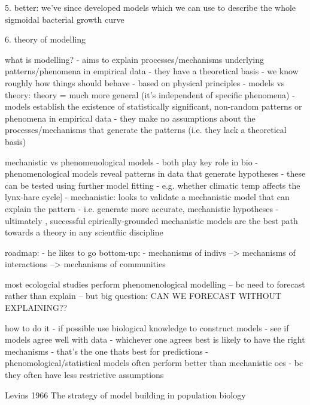 \documentclass[11pt]{article}
\begin{document}
	5. better: we've since developed models which we can use to describe the whole sigmoidal bacterial growth curve
	
	6. theory of modelling
	
	
	what is modelling?
	- aims to explain processes/mechanisms underlying patterns/phenomena in empirical data 
	- they have a theoretical basis - we know roughly how things should behave - based on physical principles
	- models vs theory: theory = much more general (it's independent of specific phenomena)
	- models establish the existence of statistically significant, non-random patterns or phenomena in empirical data
	- they make no assumptions about the processes/mechanisms that generate the patterns (i.e. they lack a theoretical basis)
	
	
	mechanistic vs phenomenological models
	- both play key role in bio
	- phenomenological models reveal patterns in data that generate hypotheses
	- these can be tested using further model fitting
	- e.g. whether climatic temp affects the lynx-hare cycle]
	- mechanistic: looks to validate a mechanistic model that can explain the pattern
	- i.e. generate more accurate, mechanistic hypotheses
	- ultimately , successful epirically-grounded mechanistic models are the best path towards a theory in any scientfiic discipline
	
	roadmap:
	- he likes to go bottom-up:
	- mechanisms of indivs --> mechanisms of interactions --> mechanisms of communities
	
	
	most ecologcial studies perform phenomenological modelling 
	-- bc need to forecast rather than explain
	-- but big question: CAN WE FORECAST WITHOUT EXPLAINING??
	
	
	how to do it
	- if possible use biological knowledge to construct models
	- see if models agree well with data
	- whichever one agrees best is likely to have the right mechanisms
	- that's the one thats best for predictions
	- phenomological/statistical models often perform better than mechanistic oes - bc they often have less restrictive assumptions
	
	
	
	
	
	
	
	
	
	
	Levins 1966 The strategy of model building in population biology \cite{levins1966strategy}
	
\end{document}
